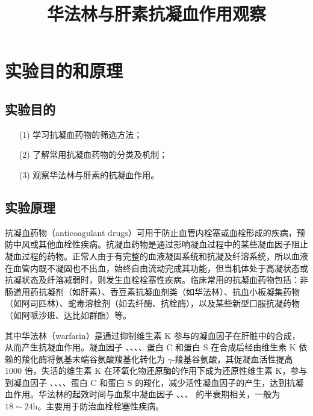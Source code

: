 \documentclass[UTF8]{ctexart}
\title{华法林与肝素抗凝血作用观察}
\author{}
\begin{document}
\date{}
\maketitle

\section{实验目的和原理}

\subsection{实验目的}

\begin{itemize}
    \item [(1)] 学习抗凝血药物的筛选方法；
    \item [(2)] 了解常用抗凝血药物的分类及机制；
    \item [(3)] 观察华法林与肝素的抗凝血作用。
\end{itemize}

\subsection{实验原理}

抗凝血药物（anticoagulant drugs）可用于防止血管内栓塞或血栓形成的疾病，预防中风或其他血栓性疾病。抗凝血药物是通过影响凝血过程中的某些凝血因子阻止凝血过程的药物。正常人由于有完整的血液凝固系统和抗凝及纤溶系统，所以血液在血管内既不凝固也不出血，始终自由流动完成其功能，但当机体处于高凝状态或抗凝状态及纤溶减弱时，则发生血栓栓塞性疾病。临床常用的抗凝血药物包括：非肠道用药抗凝剂（如肝素）、香豆素抗凝血剂类（如华法林）、抗血小板凝集药物（如阿司匹林）、蛇毒溶栓剂（如去纤酶、抗栓酶），以及某些新型口服抗凝药物（如阿哌沙班、达比如群酯）等。

其中华法林（warfarin）是通过抑制维生素 K 参与的凝血因子在肝脏中的合成，从而产生抗凝血作用。凝血因子 \uppercase\expandafter{}、\uppercase\expandafter{}、\uppercase\expandafter{}、\uppercase\expandafter{}、蛋白 C 和蛋白 S 在合成后经由维生素 K 依赖的羧化酶将氨基末端谷氨酸羧基化转化为 $\gamma$-羧基谷氨酸，其促凝血活性提高 1000 倍，失活的维生素 K 在环氧化物还原酶的作用下成为还原性维生素 K，参与到凝血因子 \uppercase\expandafter{}、\uppercase\expandafter{}、\uppercase\expandafter{}、\uppercase\expandafter{}、蛋白 C 和蛋白 S 的羧化，减少活性凝血因子的产生，达到抗凝血作用。华法林的起效时间与血浆中凝血因子 \uppercase\expandafter{}、\uppercase\expandafter{}、\uppercase\expandafter{}、\uppercase\expandafter{} 的半衰期相关，一般为 $18\sim 24\text{h}$。主要用于防治血栓栓塞性疾病。
\end{document}
